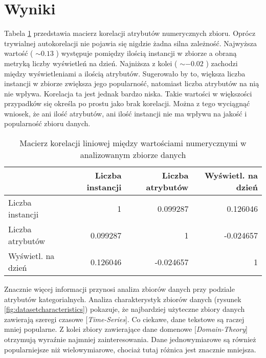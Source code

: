\section{Wyniki}

Tabela \ref{tab:correlation} przedstawia macierz korelacji atrybutów numerycznych zbioru.
Oprócz trywialnej autokorelacji nie pojawia się nigdzie żadna silna zależność.
Najwyższa wartość ( \( \sim 0.13 \) ) występuje pomiędzy ilością instancji w zbiorze a obraną metryką liczby wyświetleń na dzień.
Najniższa z kolei ( \( \sim -0.02 \) ) zachodzi między wyświetleniami a ilością atrybutów.
Sugerowało by to, większa liczba instancji w zbiorze zwiększa jego popularność, natomiast liczba atrybutów na nią nie wpływa.
Korelacja ta jest jednak bardzo niska.
Takie wartości w większości przypadków się określa po prostu jako brak korelacji.
Można z tego wyciągnąć wniosek, że ani ilość atrybutów, ani ilość instancji nie ma wpływu na jakość i popularność zbioru danych.

\begin{center}
  \begin{table}[ht]
    \begin{tabular}{|l|rrr|}
      \hline
                          & Liczba instancji & Liczba atrybutów & Wyświetl. na dzień \\
      \hline
      Liczba instancji    & 1                & 0.099287         & 0.126046           \\
      Liczba atrybutów    & 0.099287         & 1                & -0.024657          \\
      Wyświetl. na dzień  & 0.126046         & -0.024657        & 1                  \\
      \hline
    \end{tabular}
    \caption{Macierz korelacji liniowej między wartościami numerycznymi w analizowanym zbiorze danych}
    \label{tab:correlation}
  \end{table}
\end{center}

Znacznie więcej informacji przynosi analiza zbiorów danych przy podziale atrybutów kategorialnych.
Analiza charakterystyk zbiorów danych (rysunek \ref{fig:datasetcharacteristics}) pokazuje, że najbardziej użyteczne zbiory danych zawierają szeregi czasowe [\emph{Time-Series}].
Co ciekawe, dane tekstowe są raczej mniej popularne.
Z kolei zbiory zawierające dane domenowe [\emph{Domain-Theory}] otrzymują wyraźnie najmniej zainteresowania.
Dane jednowymiarowe są również popularniejsze niż wielowymiarowe, chociaż tutaj różnica jest znacznie mniejsza.

